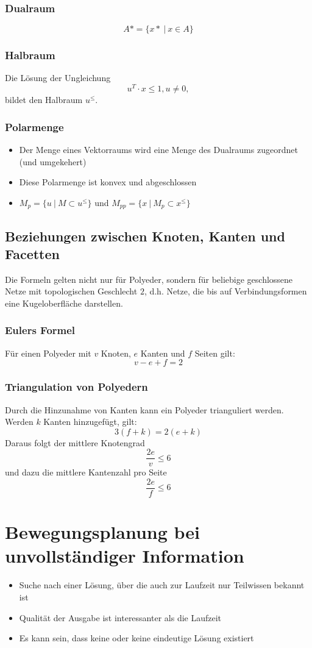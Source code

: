 \subsubsection{Dualraum}
\[A* = \{x*~|~x \in A\}\]

\subsubsection{Halbraum}
Die Lösung der Ungleichung
\[u^T \cdot x \leq 1, u \ne 0,\]
bildet den Halbraum \(u^{\leq}\).

\subsubsection{Polarmenge}
\begin{itemize}
	\item Der Menge eines Vektorraums wird eine Menge des Dualraums zugeordnet (und umgekehert)
	\item Diese Polarmenge ist konvex und abgeschlossen
	\item \(M_p = \{u~|~M \subset u^{\leq}\}\) und \(M_{pp} = \{x~|~M_p \subset x^{\leq}\}\)
\end{itemize}


\subsection{Beziehungen zwischen Knoten, Kanten und Facetten}
Die Formeln gelten nicht nur für Polyeder, sondern für beliebige geschlossene Netze mit topologischen Geschlecht \(2\), d.h. Netze, die bis auf Verbindungsformen eine Kugeloberfläche darstellen.

\subsubsection{Eulers Formel}
Für einen Polyeder mit \(v\) Knoten, \(e\) Kanten und \(f\) Seiten gilt:
\[v-e+f=2\]

\subsubsection{Triangulation von Polyedern}
Durch die Hinzunahme von Kanten kann ein Polyeder trianguliert werden. Werden \(k\) Kanten hinzugefügt, gilt:
\[3(f+k) = 2(e+k)\]
Daraus folgt der mittlere Knotengrad
\[\frac{2e}{v} \leq 6\]
und dazu die mittlere Kantenzahl pro Seite
\[\frac{2e}{f} \leq 6\]



\section{Bewegungsplanung bei unvollständiger Information}
\begin{itemize}
	\item Suche nach einer Lösung, über die auch zur Laufzeit nur Teilwissen bekannt ist
	\item Qualität der Ausgabe ist interessanter als die Laufzeit
	\item Es kann sein, dass keine oder keine eindeutige Lösung existiert
\end{itemize}


